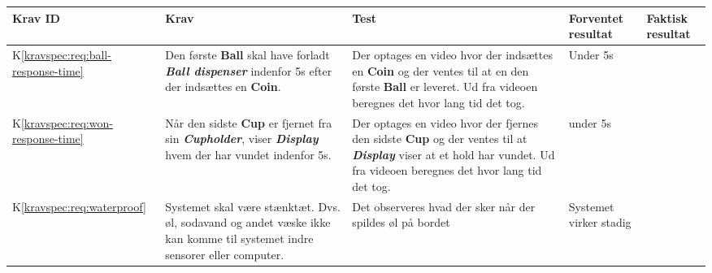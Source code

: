\documentclass[Accepttestspecifikation/Accepttest_Main.tex]{subfiles}
\begin{document}
\begin{longtable}{|L{0.08\textwidth}|L{0.3\textwidth}|L{0.3\textwidth}|L{0.2\textwidth}|L{0.2\textwidth}|}
\hline
\textbf{Krav ID} & \textbf{Krav} & \textbf{Test} & \textbf{Forventet resultat} & \textbf{Faktisk resultat} \\ \hline

K\ref{kravspec:req:ball-response-time} & Den første \textbf{Ball} skal have forladt \textit{\textbf{Ball dispenser}} indenfor 5s efter der indsættes en \textbf{Coin}. & Der optages en video hvor der indsættes en \textbf{Coin} og der ventes til at en den første \textbf{Ball} er leveret. Ud fra videoen beregnes det hvor lang tid det tog.  & Under 5s & \\ \hline
K\ref{kravspec:req:won-response-time} & Når den sidste \textbf{Cup} er fjernet fra sin \textbf{\textit{Cupholder}}, viser \textbf{\textit{Display}} hvem der har vundet indenfor 5s. & Der optages en video hvor der fjernes den sidste \textbf{Cup} og der ventes til at \textbf{\textit{Display}} viser at et hold har vundet. Ud fra videoen beregnes det hvor lang tid det tog. & under 5s & \\ \hline
K\ref{kravspec:req:waterproof} & Systemet skal være stænktæt. Dvs. øl, sodavand og andet væske ikke kan komme til systemet indre sensorer eller computer. & Det observeres hvad der sker når der spildes øl på bordet & Systemet virker stadig & \\ \hline


\end{longtable}
\end{document}
